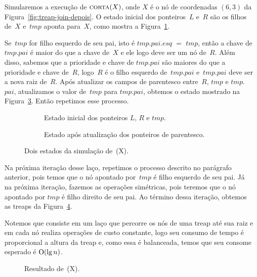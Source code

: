 Simularemos a execução de $\text{\scshape corta}(X)$, onde $X$ é o nó de coordenadas $(6,3)$ da Figura~\ref{fig:treap-join-depois}.
O estado inicial dos ponteiros~$L$ e~$R$ são os filhos de~$X$ e~$tmp$ aponta para~$X$, como mostra a Figura~\ref{fig:treap-split-1}.

Se~$tmp$ for filho esquerdo de seu pai, isto é $tmp$.$pai$.$esq$ $=$ $tmp$, então a chave de $tmp$.$pai$ é maior do que a chave de~$X$ e ele logo deve ser um nó de~$R$.
Além disso, sabemos que a prioridade e chave de $tmp$.$pai$ são maiores do que a prioridade e chave de~$R$,
logo~$R$ é o filho esquerdo de~$tmp$.$pai$ e~$tmp$.$pai$ deve ser a nova raiz de~$R$. 
Após atualizar os campos de parentesco entre~$R$, $tmp$ e $tmp$.$pai$, atualizamos o valor de~$tmp$ para $tmp$.$pai$, obtemos o estado mostrado na Figura~\ref{fig:treap-split-2}.
Então repetimos esse processo. 

\begin{figure}[htb]
\begin{subfigure}{0.3\textwidth}

\caption{Estado inicial dos ponteiros $L$, $R$ e $tmp$.}
\label{fig:treap-split-1}
\end{subfigure}
\hspace{3cm}
\begin{subfigure}{0.3\textwidth}

\caption{Estado após atualização dos ponteiros de parentesco.}
\label{fig:treap-split-2}
\end{subfigure}
\caption{Dois estados da simulação de~\treapSplit(X).}
\end{figure}

Na próxima iteração desse laço, repetimos o processo descrito no parágrafo anterior, pois temos que o nó apontado por~$tmp$ é filho esquerdo de seu pai.
Já na próxima iteração, fazemos as operações simétricas, pois teremos que o nó apontado por $tmp$ é filho direito de seu pai.
Ao término dessa iteração, obtemos as treaps da Figura~\ref{fig:treap-split-final}.

Notemos que \treapSplit{} consiste em um laço que percorre os nós de uma treap até sua raiz e em cada nó realiza operações de custo constante, logo seu consumo de tempo é proporcional a altura da treap e, como essa é balanceada, temos que seu consome esperado é $\mathrm{O}(\lg n)$.

\begin{figure}[htb]
\centering

\caption{Resultado de~\treapSplit(X).}
\label{fig:treap-split-final}
\end{figure}
